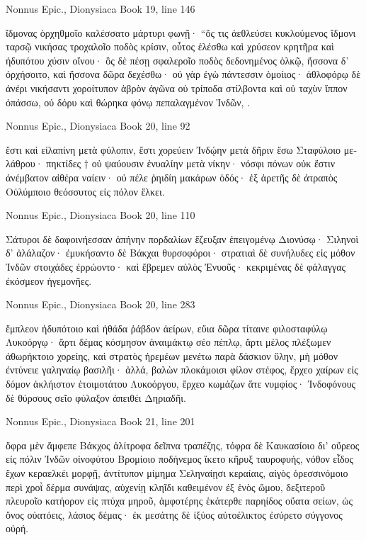 \documentclass[12pt,letterpaper,twoside,final]{memoir}
\begin{document}
\begin{greek}
Nonnus Epic., Dionysiaca 
Book 19, line 146

ἴδμονας ὀρχηθμοῖο καλέσσατο μάρτυρι φωνῇ· 
 “ὅς τις ἀεθλεύσει κυκλούμενος ἴδμονι ταρσῷ 
νικήσας τροχαλοῖο ποδὸς κρίσιν, οὗτος ἑλέσθω   
καὶ χρύσεον κρητῆρα καὶ ἡδυπότου χύσιν οἴνου· 
ὃς δὲ πέσῃ σφαλεροῖο ποδὸς δεδονημένος ὁλκῷ, 
ἥσσονα δ' ὀρχήσοιτο, καὶ ἥσσονα δῶρα δεχέσθω· 
οὐ γὰρ ἐγὼ πάντεσσιν ὁμοίιος· ἀθλοφόρῳ δὲ 
ἀνέρι νικήσαντι χοροίτυπον ἁβρὸν ἀγῶνα 
οὐ τρίποδα στίλβοντα καὶ οὐ ταχὺν ἵππον ὀπάσσω, 
οὐ δόρυ καὶ θώρηκα φόνῳ πεπαλαγμένον Ἰνδῶν, . 



Nonnus Epic., Dionysiaca 
Book 20, line 92

ἔστι καὶ εἰλαπίνη μετὰ φύλοπιν, ἔστι χορεύειν 
Ἰνδῴην μετὰ δῆριν ἔσω Σταφύλοιο μελάθρου· 
πηκτίδες † οὐ ψαύουσιν ἐνυαλίην μετὰ νίκην· 
νόσφι πόνων οὐκ ἔστιν ἀνέμβατον αἰθέρα ναίειν· 
οὐ πέλε ῥηιδίη μακάρων ὁδός· ἐξ ἀρετῆς δὲ 
ἀτραπὸς Οὐλύμποιο θεόσσυτος εἰς πόλον ἕλκει. 



Nonnus Epic., Dionysiaca 
Book 20, line 110

                  Σάτυροι δὲ δαφοινήεσσαν ἀπήνην 
πορδαλίων ἔζευξαν ἐπειγομένῳ Διονύσῳ· 
Σιληνοὶ δ' ἀλάλαζον· ἐμυκήσαντο δὲ Βάκχαι 
θυρσοφόροι· στρατιαὶ δὲ συνήλυδες εἰς μόθον Ἰνδῶν 
στοιχάδες ἐρρώοντο· καὶ ἔβρεμεν αὐλὸς Ἐνυοῦς· 
κεκριμένας δὲ φάλαγγας ἐκόσμεον ἡγεμονῆες. 



Nonnus Epic., Dionysiaca 
Book 20, line 283

ἔμπλεον ἡδυπότοιο καὶ ἠθάδα ῥάβδον ἀείρων, 
εὔια δῶρα τίταινε φιλοσταφύλῳ Λυκοόργῳ·   
ἄρτι δέμας κόσμησον ἀναιμάκτῳ σέο πέπλῳ, 
ἄρτι μέλος πλέξωμεν ἀθωρήκτοιο χορείης, 
καὶ στρατὸς ἠρεμέων μενέτω παρὰ δάσκιον ὕλην, 
μὴ μόθον ἐντύνειε γαληναίῳ βασιλῆι· 
ἀλλά, βαλὼν πλοκάμοισι φίλον στέφος, ἔρχεο χαίρων 
εἰς δόμον ἀκλήιστον ἑτοιμοτάτου Λυκοόργου, 
ἔρχεο κωμάζων ἅτε νυμφίος· Ἰνδοφόνους δὲ 
θύρσους σεῖο φύλαξον ἀπειθέι Δηριαδῆι. 



Nonnus Epic., Dionysiaca 
Book 21, line 201

ὄφρα μὲν ἄμφεπε Βάκχος ἁλίτροφα δεῖπνα τραπέζης, 
τόφρα δὲ Καυκασίοιο δι' οὔρεος εἰς πόλιν Ἰνδῶν 
οἰνοφύτου Βρομίοιο ποδήνεμος ἵκετο κῆρυξ 
ταυροφυής, νόθον εἶδος ἔχων κεραελκέι μορφῇ, 
ἀντίτυπον μίμημα Σεληναίῃσι κεραίαις, 
αἰγὸς ὀρεσσινόμοιο περὶ χροῒ δέρμα συνάψας, 
αὐχενίῃ κληῖδι καθειμένον ἐξ ἑνὸς ὤμου, 
δεξιτεροῦ πλευροῖο κατήορον εἰς πτύχα μηροῦ, 
ἀμφοτέρης ἑκάτερθε παρηίδος οὔατα σείων, 
ὡς ὄνος οὐατόεις, λάσιος δέμας· ἐκ μεσάτης δὲ 
ἰξύος αὐτοέλικτος ἐσύρετο σύγγονος οὐρή. 




\end{greek}
\end{document}
